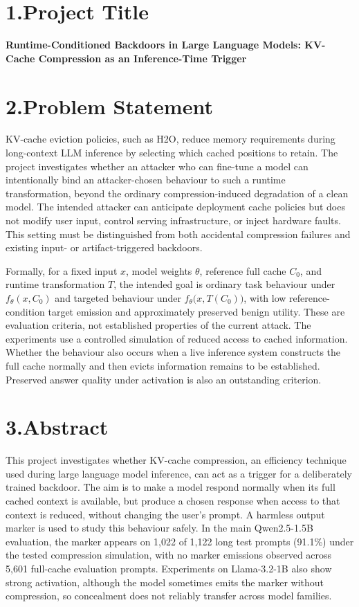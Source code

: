\documentclass[11pt,a4paper]{article}
\begin{document}
\section*{1.\quad Project Title}
\textbf{Runtime-Conditioned Backdoors in Large Language Models: KV-Cache Compression as an Inference-Time Trigger}

\section*{2.\quad Problem Statement}
KV-cache eviction policies, such as H2O, reduce memory requirements during long-context LLM inference by selecting which cached positions to retain. The project investigates whether an attacker who can fine-tune a model can intentionally bind an attacker-chosen behaviour to such a runtime transformation, beyond the ordinary compression-induced degradation of a clean model. The intended attacker can anticipate deployment cache policies but does not modify user input, control serving infrastructure, or inject hardware faults. This setting must be distinguished from both accidental compression failures and existing input- or artifact-triggered backdoors.

Formally, for a fixed input $x$, model weights $\theta$, reference full cache $C_0$, and runtime transformation $T$, the intended goal is ordinary task behaviour under $f_\theta(x,C_0)$ and targeted behaviour under $f_\theta\big(x,T(C_0)\big)$, with low reference-condition target emission and approximately preserved benign utility. These are evaluation criteria, not established properties of the current attack. The experiments use a controlled simulation of reduced access to cached information. Whether the behaviour also occurs when a live inference system constructs the full cache normally and then evicts information remains to be established. Preserved answer quality under activation is also an outstanding criterion.

\section*{3.\quad Abstract}
This project investigates whether KV-cache compression, an efficiency technique used during large language model inference, can act as a trigger for a deliberately trained backdoor. The aim is to make a model respond normally when its full cached context is available, but produce a chosen response when access to that context is reduced, without changing the user's prompt. A harmless output marker is used to study this behaviour safely. In the main Qwen2.5-1.5B evaluation, the marker appears on 1,022 of 1,122 long test prompts (91.1\%) under the tested compression simulation, with no marker emissions observed across 5,601 full-cache evaluation prompts. Experiments on Llama-3.2-1B also show strong activation, although the model sometimes emits the marker without compression, so concealment does not reliably transfer across model families.
\end{document}
